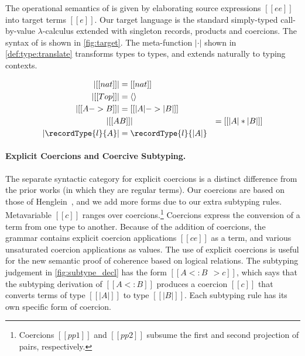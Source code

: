 The operational semantics of \namee is given by elaborating source expressions
$[[ee]]$ into target terms $[[e]]$. Our target language \tname is the standard
simply-typed call-by-value $\lambda$-calculus extended with singleton records,
products and coercions. The syntax of \tname is shown in \cref{fig:target}. The
meta-function $| \cdot |$ shown in \cref{def:type:translate} transforms \namee
types to \tname types, and extends naturally to typing contexts.

\begin{definition} \label{def:type:translate}
  \begin{align*}
    | [[nat]] | &= [[nat]] \\
    | [[Top]] | &= \langle \rangle \\
    | [[A -> B]]  | &= [[ | A | -> | B |  ]] \\
    | [[ A & B  ]] | &= [[ | A | * | B |  ]] \\
    | \recordType{l}{A} | &= \recordType{l}{| A |}
  \end{align*}
\end{definition}



\paragraph{Explicit Coercions and Coercive Subtyping.}

The separate syntactic category for explicit coercions is a distinct
difference from the prior works (in which they are regular terms). Our coercions
are based on those of Henglein~\cite{Henglein_1994}, and we add more forms due to our
extra subtyping rules.
Metavariable $[[c]]$ ranges over coercions.\footnote{Coercions $[[pp1]]$ and $[[pp2]]$ subsume the first and second projection of pairs, respectively.}
Coercions express the conversion
of a term from one type to another. Because of the addition of coercions, the
grammar contains explicit coercion applications $[[c e]]$ as a term, and various
unsaturated coercion applications as values. The use of explicit coercions is useful for the new semantic
proof of coherence based on logical relations.
The subtyping judgement in \cref{fig:subtype_decl} has the form $[[A <: B ~~> c]]$, which says that the
subtyping derivation of $[[A <: B]]$ produces a coercion $[[c]]$ that converts
terms of type $[[ |A| ]]$ to type $[[ |B| ]]$. Each subtyping rule has its own
specific form of coercion.



